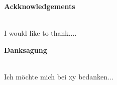 

\begin{center}
\large \textbf{Ackknowledgements} \\
~\\ %


\end{center}
I would like to thank....

\vfill %
\begin{center}
\large \textbf{Danksagung} \\
~\\ %
\end{center}
Ich möchte mich bei xy bedanken...